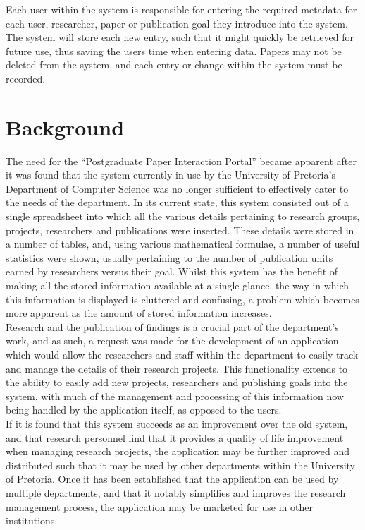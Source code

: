 \documentclass{article}
\begin{document}
Each user within the system is responsible for entering the required metadata for each user, researcher, paper or publication goal they introduce into the system. The system will store each new entry, such that it might quickly be retrieved for future use, thus saving the users time when entering data. Papers may not be deleted from the system, and each entry or change within the system must be recorded.\\


\newpage
\section{Background}
The need for the “Postgraduate Paper Interaction Portal” became apparent after it was found that the system currently in use by the University of Pretoria’s Department of Computer Science was no longer sufficient to effectively cater to the needs of the department. In its current state, this system consisted out of a single spreadsheet into which all the various details pertaining to research groups, projects, researchers and publications were inserted. These details were stored in a number of tables, and, using various mathematical formulae, a number of useful statistics were shown, usually pertaining to the number of publication units earned by researchers versus their goal. Whilst this system has the benefit of making all the stored information available at a single glance, the way in which this information is displayed is cluttered and confusing, a problem which becomes more apparent as the amount of stored information increases.\\


Research and the publication of findings is a crucial part of the department’s work, and as such, a request was made for the development of an application which would allow the researchers and staff within the department to easily track and manage the details of their research projects. This functionality extends to the ability to easily add new projects, researchers and publishing goals into the system, with much of the management and processing of this information now being handled by the application itself, as opposed to the users.\\


If it is found that this system succeeds as an improvement over the old system, and that research personnel find that it provides a quality of life improvement when managing research projects, the application may be further improved and distributed such that it may be used by other departments within the University of Pretoria. Once it has been established that the application can be used by multiple departments, and that it notably simplifies and improves the research management process, the application may be marketed for use in other institutions.
\end{document}
